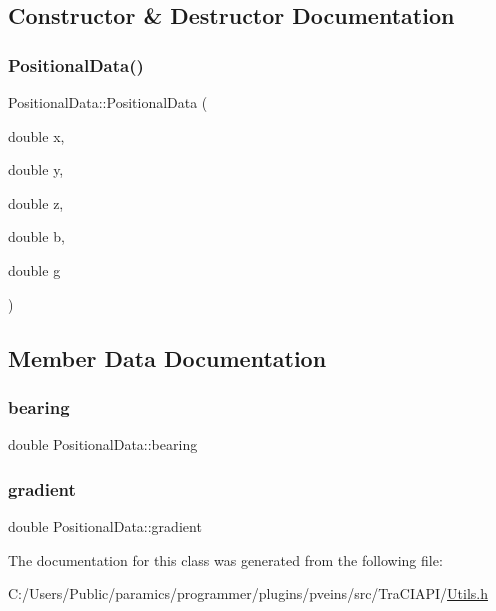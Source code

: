 \subsection{Constructor \& Destructor Documentation}
\mbox{\label{class_positional_data_a31b77f08d0a18c72e3b21cac6bc2d095}} 
\subsubsection{\texorpdfstring{Positional\+Data()}{PositionalData()}}
{\footnotesize\ttfamily Positional\+Data\+::\+Positional\+Data (\begin{DoxyParamCaption}\item[{double}]{x,  }\item[{double}]{y,  }\item[{double}]{z,  }\item[{double}]{b,  }\item[{double}]{g }\end{DoxyParamCaption})\hspace{0.3cm}{\ttfamily [inline]}}



\subsection{Member Data Documentation}
\mbox{\label{class_positional_data_a2ae5a622a025a392acfb29c66e6c310e}} 
\subsubsection{\texorpdfstring{bearing}{bearing}}
{\footnotesize\ttfamily double Positional\+Data\+::bearing}

\mbox{\label{class_positional_data_a2aa73f7333432a8b32d2036f4c940ff3}} 
\subsubsection{\texorpdfstring{gradient}{gradient}}
{\footnotesize\ttfamily double Positional\+Data\+::gradient}



The documentation for this class was generated from the following file\+:\begin{DoxyCompactItemize}
\item 
C\+:/\+Users/\+Public/paramics/programmer/plugins/pveins/src/\+Tra\+C\+I\+A\+P\+I/\hyperlink{_utils_8h}{Utils.\+h}\end{DoxyCompactItemize}
